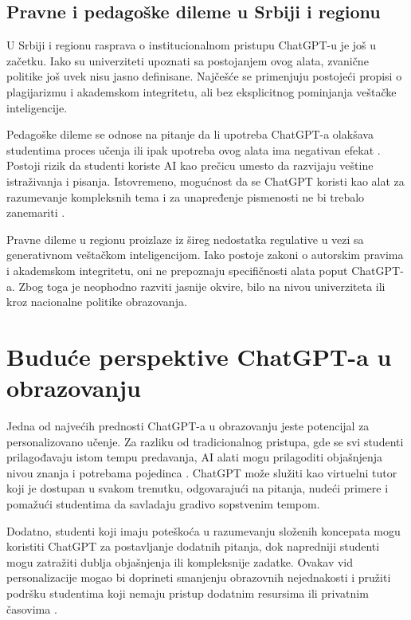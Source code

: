\documentclass[12pt]{article}
\begin{document}
\subsection{Pravne i pedagoške dileme u Srbiji i regionu}

U Srbiji i regionu rasprava o institucionalnom pristupu ChatGPT-u je još u začetku. Iako su univerziteti upoznati sa postojanjem ovog alata, zvanične politike još uvek nisu jasno definisane. Najčešće se primenjuju postojeći propisi o plagijarizmu i akademskom integritetu, ali bez eksplicitnog pominjanja veštačke inteligencije.

Pedagoške dileme se odnose na pitanje da li upotreba ChatGPT-a olakšava studentima proces učenja ili ipak upotreba ovog alata ima negativan efekat \cite{montenegro2023impact}. Postoji rizik da studenti koriste AI kao prečicu umesto da razvijaju veštine istraživanja i pisanja. Istovremeno, mogućnost da se ChatGPT koristi kao alat za razumevanje kompleksnih tema i za unapređenje pismenosti ne bi trebalo zanemariti \cite{mahapatra2024impact}.

Pravne dileme u regionu proizlaze iz šireg nedostatka regulative u vezi sa generativnom veštačkom inteligencijom. Iako postoje zakoni o autorskim pravima i akademskom integritetu, oni ne prepoznaju specifičnosti alata poput ChatGPT-a. Zbog toga je neophodno razviti jasnije okvire, bilo na nivou univerziteta ili kroz nacionalne politike obrazovanja.

\section{Buduće perspektive ChatGPT-a u obrazovanju}

Jedna od najvećih prednosti ChatGPT-a u obrazovanju jeste potencijal za personalizovano učenje. Za razliku od tradicionalnog pristupa, gde se svi studenti prilagođavaju istom tempu predavanja, AI alati mogu prilagoditi objašnjenja nivou znanja i potrebama pojedinca \cite{mahapatra2024impact}. ChatGPT može služiti kao virtuelni tutor koji je dostupan u svakom trenutku, odgovarajući na pitanja, nudeći primere i pomažući studentima da savladaju gradivo sopstvenim tempom.

Dodatno, studenti koji imaju poteškoća u razumevanju složenih koncepata mogu koristiti ChatGPT za postavljanje dodatnih pitanja, dok napredniji studenti mogu zatražiti dublja objašnjenja ili kompleksnije zadatke. Ovakav vid personalizacije mogao bi doprineti smanjenju obrazovnih nejednakosti i pružiti podršku studentima koji nemaju pristup dodatnim resursima ili privatnim časovima \cite{baig2024systematic}.
\end{document}
